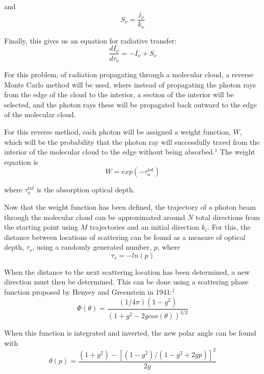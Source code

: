 \documentclass[a4paper, 10pt]{article}
\begin{document}
\noindent and 
\begin{equation}
S_\nu=\frac{j_\nu}{k_\nu}
\end{equation}

\noindent Finally, this gives us an equation for radiative transfer: 
\begin{equation}
\frac{dI_\nu}{d\tau_\nu}=-I_\nu+S_\nu
\end{equation}

For this problem, of radiation propagating through a molecular cloud, a reverse Monte Carlo method will be used, where instead of propagating the photon rays from the edge of the cloud to the interior, a section of the interior will be selected, and the photon rays these will be propagated back outward to the edge of the molecular cloud. 

For this reverse method, each photon will be assigned a weight function, $W$, which will be the probability that the photon ray will successfully travel from the interior of the molecular cloud to the edge without being absorbed.$^1$ The weight equation is
\begin{equation}
W=exp(-\tau_a^{tot}) 
\end{equation}

\noindent where $\tau_a^{tot}$ is the absorption optical depth. 

Now that the weight function has been defined, the trajectory of a photon beam through the molecular cloud can be approximated around $N$ total directions from the starting point using $M$ trajectories and an initial direction $k_i$. For this, the distance between locations of scattering can be found as a measure of optical depth, $\tau_s$, using a randomly generated number, $p$, where
\begin{equation}
\tau_s=-ln(p)
\end{equation}

When the distance to the next scattering location has been determined, a new direction must then be determined. This can be done using a scattering phase function proposed by Henyey and Greenstein in 1941:$^1$
\begin{equation}
\Phi(\theta)=\frac{(1/4\pi)(1-g^2)}{(1+g^2-2gcos(\theta))^{3/2}}
\end{equation}

\noindent When this function is integrated and inverted, the new polar angle can be found with
\begin{equation}
\theta(p)=\frac{(1+g^2)-[(1-g^2)/(1-g^2+2gp)]^2}{2g}
\end{equation}
\end{document}
